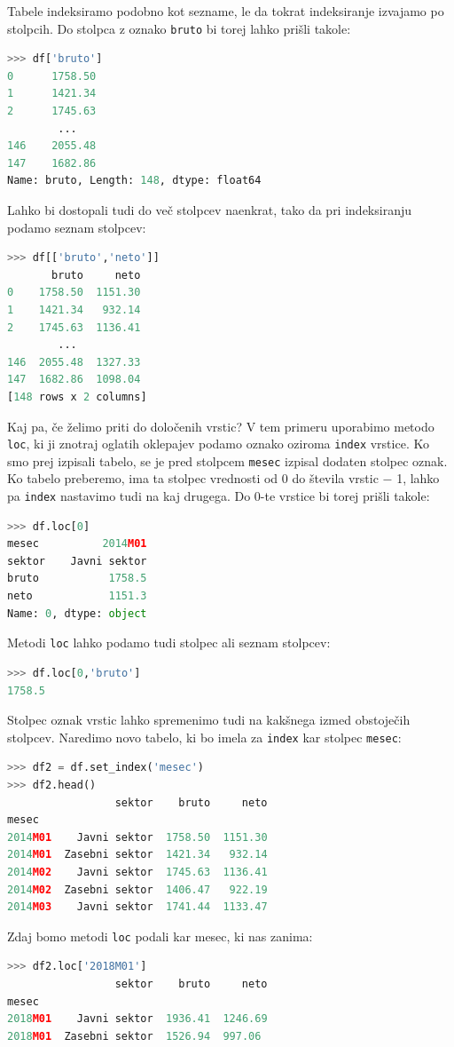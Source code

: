 Tabele indeksiramo podobno kot sezname, le da tokrat indeksiranje izvajamo po stolpcih. Do stolpca z oznako  \texttt{bruto} bi torej lahko prišli takole:
\begin{lstlisting}[language=python]
>>> df['bruto']
0      1758.50
1      1421.34
2      1745.63
        ...
146    2055.48
147    1682.86
Name: bruto, Length: 148, dtype: float64
\end{lstlisting}
Lahko bi dostopali tudi do več stolpcev naenkrat, tako da pri indeksiranju podamo seznam stolpcev:
\begin{lstlisting}[language=python]
>>> df[['bruto','neto']]
       bruto     neto
0    1758.50  1151.30
1    1421.34   932.14
2    1745.63  1136.41
        ...
146  2055.48  1327.33
147  1682.86  1098.04
[148 rows x 2 columns]
\end{lstlisting}

Kaj pa, če želimo priti do določenih vrstic? V tem primeru uporabimo metodo \texttt{loc}, ki ji znotraj oglatih oklepajev podamo oznako oziroma \texttt{index} vrstice. Ko smo prej izpisali tabelo, se je pred stolpcem \texttt{mesec} izpisal dodaten stolpec oznak. Ko tabelo preberemo, ima ta stolpec vrednosti od 0 do števila vrstic $-$ 1, lahko pa \texttt{index} nastavimo tudi na kaj drugega. Do 0-te vrstice bi torej prišli takole:
\begin{lstlisting}[language=python]
>>> df.loc[0]
mesec          2014M01
sektor    Javni sektor
bruto           1758.5
neto            1151.3
Name: 0, dtype: object
\end{lstlisting}
Metodi \texttt{loc} lahko podamo tudi stolpec ali seznam stolpcev:
\begin{lstlisting}[language=python]
>>> df.loc[0,'bruto']
1758.5
\end{lstlisting}
Stolpec oznak vrstic lahko spremenimo tudi na kakšnega izmed obstoječih stolpcev. Naredimo novo tabelo, ki bo imela za \texttt{index} kar stolpec \texttt{mesec}:
\begin{lstlisting}[language=python]
>>> df2 = df.set_index('mesec')
>>> df2.head()
                 sektor    bruto     neto
mesec                                    
2014M01    Javni sektor  1758.50  1151.30
2014M01  Zasebni sektor  1421.34   932.14
2014M02    Javni sektor  1745.63  1136.41
2014M02  Zasebni sektor  1406.47   922.19
2014M03    Javni sektor  1741.44  1133.47
\end{lstlisting}
Zdaj bomo metodi \texttt{loc} podali kar mesec, ki nas zanima:
\begin{lstlisting}[language=python]
>>> df2.loc['2018M01']
                 sektor    bruto     neto
mesec                                    
2018M01    Javni sektor  1936.41  1246.69
2018M01  Zasebni sektor  1526.94  997.06
\end{lstlisting}

